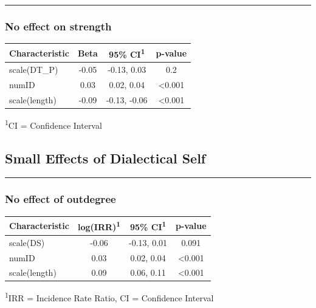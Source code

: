 \documentclass[
  .7em,
  letterpaper,
  DIV=11,
  numbers=noendperiod]{scrartcl}
\begin{document}
\begin{center}\rule{0.5\linewidth}{0.5pt}\end{center}

\hypertarget{no-effect-on-strength-3}{%
\subsubsection{No effect on strength}\label{no-effect-on-strength-3}}

\captionsetup[table]{labelformat=empty,skip=1pt}
\setlength{\LTpost}{0mm}
\begin{longtable}{lccc}
\toprule
\textbf{Characteristic} & \textbf{Beta} & \textbf{95\% CI}\textsuperscript{1} & \textbf{p-value} \\ 
\midrule
scale(DT\_P) & -0.05 & -0.13, 0.03 & 0.2 \\ 
numID & 0.03 & 0.02, 0.04 & <0.001 \\ 
scale(length) & -0.09 & -0.13, -0.06 & <0.001 \\ 
\bottomrule
\end{longtable}
\begin{minipage}{\linewidth}
\textsuperscript{1}CI = Confidence Interval\\
\end{minipage}

\hypertarget{small-effects-of-dialectical-self}{%
\subsection{Small Effects of Dialectical
Self}\label{small-effects-of-dialectical-self}}

\begin{center}\rule{0.5\linewidth}{0.5pt}\end{center}

\hypertarget{no-effect-of-outdegree}{%
\subsubsection{No effect of outdegree}\label{no-effect-of-outdegree}}

\captionsetup[table]{labelformat=empty,skip=1pt}
\setlength{\LTpost}{0mm}
\begin{longtable}{lccc}
\toprule
\textbf{Characteristic} & \textbf{log(IRR)}\textsuperscript{1} & \textbf{95\% CI}\textsuperscript{1} & \textbf{p-value} \\ 
\midrule
scale(DS) & -0.06 & -0.13, 0.01 & 0.091 \\ 
numID & 0.03 & 0.02, 0.04 & <0.001 \\ 
scale(length) & 0.09 & 0.06, 0.11 & <0.001 \\ 
\bottomrule
\end{longtable}
\begin{minipage}{\linewidth}
\textsuperscript{1}IRR = Incidence Rate Ratio, CI = Confidence Interval\\
\end{minipage}
\end{document}

